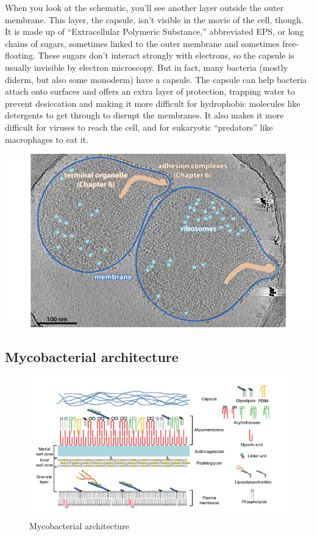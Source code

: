 \documentclass[]{tufte-book}
\begin{document}
When you look at the schematic, you'll see another layer outside the
outer membrane. This layer, the capsule, isn't visible in the movie of
the cell, though. It is made up of ``Extracellular Polymeric
Substance,'' abbreviated EPS, or long chains of sugars, sometimes linked
to the outer membrane and sometimes free-floating. These sugars don't
interact strongly with electrons, so the capsule is usually invisible by
electron microscopy. But in fact, many bacteria (mostly diderm, but also
some monoderm) have a capsule. The capsule can help bacteria attach onto
surfaces and offers an extra layer of protection, trapping water to
prevent desiccation and making it more difficult for hydrophobic
molecules like detergents to get through to disrupt the membranes. It
also makes it more difficult for viruses to reach the cell, and for
eukaryotic ``predators'' like macrophages to eat it.

\includegraphics{img/02_static/2_1_Mgenitalium}

\subsection{Mycobacterial
architecture}\label{mycobacterial-architecture}

\begin{figure}
\includegraphics{img/02_schematic/2_5_1_Mycobacteria} \caption[Mycobacterial architecture]{Mycobacterial architecture}\label{fig:2-5-1}
\end{figure}
\end{document}
